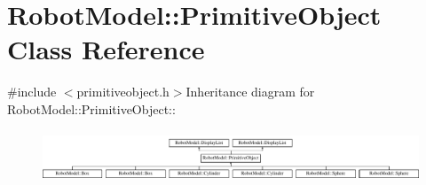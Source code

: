 \hypertarget{class_robot_model_1_1_primitive_object}{
\section{RobotModel::PrimitiveObject Class Reference}
\label{class_robot_model_1_1_primitive_object}
}


{\ttfamily \#include $<$primitiveobject.h$>$}Inheritance diagram for RobotModel::PrimitiveObject::\begin{figure}[H]
\begin{center}
\leavevmode
\includegraphics[height=1.57303cm]{class_robot_model_1_1_primitive_object}
\end{center}
\end{figure}
